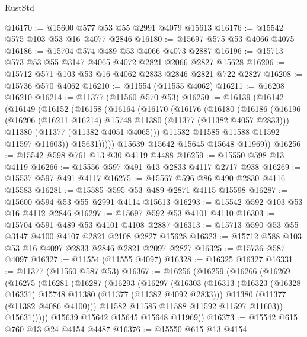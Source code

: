 \begin{lexlean}{RustStd}
\begin{coremodule}
@16170 := @15600 @577 @53 @55 @2991 @4079 @15613
@16176 := @15542 @575 @103 @53 @16 @4077 @2846
@16180 := @15697 @575 @53 @4066 @4075
@16186 := @15704 @574 @489 @53 @4066 @4073 @2887
@16196 := @15713 @573 @53 @55 @3147 @4065 @4072 @2821 @2066 @2827 @15628
@16206 := @15712 @571 @103 @53 @16 @4062 @2833 @2846 @2821 @722 @2827
@16208 := @15736 @570 @4062
@16210 := @11554 (@11555 @4062)
@16211 := @16208 @16210
@16214 := @11377 (@11560 @570 @53)
@16250 := @16139
    (@16142
      (@16149
        (@16152
          (@16158
            (@16164
              (@16170
                (@16176
                  (@16180
                    (@16186
                      (@16196
                        (@16206 (@16211 @16214) @15748 @11380 (@11377 (@11382 @4057 @2833)))
                        @11380
                        (@11377 (@11382 @4051 @4065)))
                      @11582
                      @11585
                      @11588
                      @11592
                      @11597
                      @11603))
                  @15631)))))
        @15639
        @15642
        @15645
        @15648
        @11969))
@16256 := @15542 @598 @761 @13 @30 @4119 @4488
@16259 := @15550 @598 @13 @4119
@16266 := @15556 @597 @491 @13 @2833 @4117 @2717 @938
@16269 := @15537 @597 @491 @4117
@16275 := @15567 @596 @86 @490 @2830 @4116 @15583
@16281 := @15585 @595 @53 @489 @2871 @4115 @15598
@16287 := @15600 @594 @53 @55 @2991 @4114 @15613
@16293 := @15542 @592 @103 @53 @16 @4112 @2846
@16297 := @15697 @592 @53 @4101 @4110
@16303 := @15704 @591 @489 @53 @4101 @4108 @2887
@16313 := @15713 @590 @53 @55 @3147 @4100 @4107 @2821 @2108 @2827 @15628
@16323 := @15712 @588 @103 @53 @16 @4097 @2833 @2846 @2821 @2097 @2827
@16325 := @15736 @587 @4097
@16327 := @11554 (@11555 @4097)
@16328 := @16325 @16327
@16331 := @11377 (@11560 @587 @53)
@16367 := @16256
    (@16259
      (@16266
        (@16269
          (@16275
            (@16281
              (@16287
                (@16293
                  (@16297
                    (@16303
                      (@16313
                        (@16323 (@16328 @16331) @15748 @11380 (@11377 (@11382 @4092 @2833)))
                        @11380
                        (@11377 (@11382 @4086 @4100)))
                      @11582
                      @11585
                      @11588
                      @11592
                      @11597
                      @11603))
                  @15631)))))
        @15639
        @15642
        @15645
        @15648
        @11969))
@16373 := @15542 @615 @760 @13 @24 @4154 @4487
@16376 := @15550 @615 @13 @4154

\end{coremodule}
\end{lexlean}
